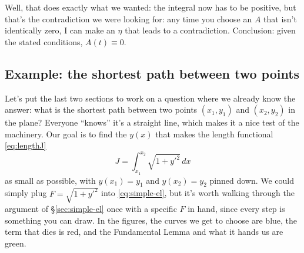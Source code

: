 \documentclass[12pt]{article}
\numberwithin{equation}{section}
\begin{document}
Well, that does exactly what we wanted: the integral now has to
be positive, but that's the contradiction we were looking for: any
time you choose an $A$ that isn't identically zero, I can make an
$\eta$ that leads to a contradiction. Conclusion: given the stated
conditions, $A(t) \equiv 0$.

\subsection{Example: the shortest path between two points}
\label{sec:shortest-path}

Let's put the last two sections to work on a question where we
already know the answer: what is the shortest path between two points
$(x_1,y_1)$ and $(x_2,y_2)$ in the plane? Everyone ``knows'' it's a
straight line, which makes it a nice test of the machinery. Our goal
is to find the $y(x)$ that makes the length functional
\eqref{eq:lengthJ}
\begin{equation}
  \label{eq:shortJ}
  J = \int_{x_1}^{x_2}\sqrt{1+y'^2}\,dx
\end{equation}
as small as possible, with $y(x_1)=y_1$ and $y(x_2)=y_2$ pinned down.
We could simply plug $F=\sqrt{1+y'^2}$ into \eqref{eq:simple-el}, but
it's worth walking through the argument of \S\ref{sec:simple-el} once
with a specific $F$ in hand, since every step is something you can
draw. In the figures, the curves we get to choose are
\textcolor{etablue}{blue}, the term that dies is
\textcolor{deadred}{red}, and the Fundamental Lemma and what it hands
us are \textcolor{lemmagreen}{green}.
\end{document}
